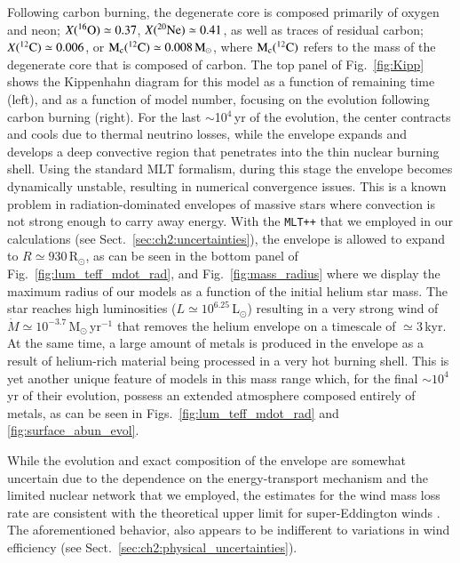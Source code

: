 \documentclass[main.tex]{subfiles}
\begin{document}
Following carbon burning, the degenerate core is composed primarily of oxygen and neon; $X(\iso{O}{16}) \simeq 0.37$, $X(\iso{Ne}{20}) \simeq 0.41$, as well as traces of residual carbon; $X(\iso{C}{12}) \simeq 0.006$, or $ \rm M_c (\iso{C}{12}) \simeq 0.008\msun$, where $\rm M_c (\iso{C}{12})$ refers to the mass of the degenerate core that is composed of carbon. The top panel of Fig.~\ref{fig:Kipp} shows the Kippenhahn diagram for this model as a function of remaining time (left), and as a function of model number, focusing on the evolution following carbon burning (right). 
For the last $\sim$10$^4$\,yr of the evolution, the center contracts and cools due to thermal neutrino losses, while the envelope 
expands and develops a deep convective region that penetrates into the thin nuclear burning shell. Using the standard MLT formalism, during this stage the envelope becomes dynamically unstable, resulting in numerical convergence issues. This is a known 
problem in radiation-dominated envelopes of massive stars where convection is not strong enough to carry away  energy. With the 
\texttt{MLT++} that we employed in our calculations  (see Sect.~\ref{sec:ch2:uncertainties}),  the envelope is allowed to expand to $R \simeq 
930$\,R$_\odot$, as can be seen in the bottom panel of Fig.~\ref{fig:lum_teff_mdot_rad}, and Fig.~\ref{fig:mass_radius} where
we display the maximum radius of our \seriesone models as a function of the initial helium star mass. The star reaches high luminosities ($L \simeq 10^{6.25}$\,L$_\odot$) 
resulting in a very strong wind of $\dot{M} \simeq 
10^{-3.7}$\,M$_\odot$\,yr$^{-1}$ that removes the 
helium envelope on a timescale of $\simeq 3$\,kyr. 
At the same time, a large amount of metals is produced in the 
envelope as a result of helium-rich material being processed in a very hot burning shell. 
This is yet another unique feature of models in this mass range which, 
for the final $\sim 10^{4}$\,yr of their evolution, possess an 
extended atmosphere composed entirely of metals, as can be seen 
in Figs.~\ref{fig:lum_teff_mdot_rad} and \ref{fig:surface_abun_evol}.


While the evolution and exact composition of the envelope are somewhat 
uncertain due to the dependence on the energy-transport mechanism and 
the limited nuclear network that we employed,  the estimates for the wind mass loss rate 
are consistent with  the theoretical upper limit for 
super-Eddington winds  \citep{Owocki:2004zz, Smith2006}. The 
aforementioned behavior, also appears to be indifferent 
to variations in wind efficiency (see Sect.~\ref{sec:ch2:physical_uncertainties}).
\end{document}
